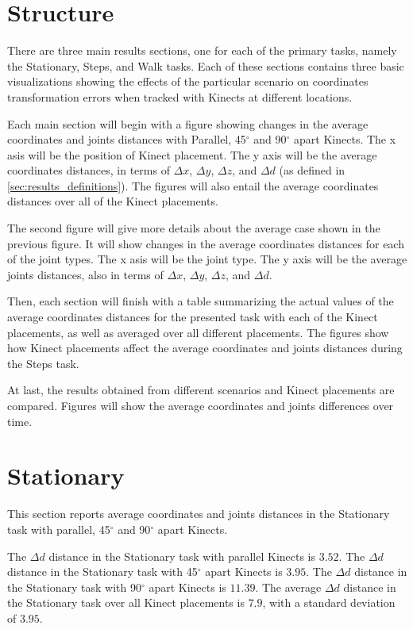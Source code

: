 \section{Structure}
\label{sec:results_structure}

There are three main results sections, one for each of the primary tasks, namely the Stationary, Steps, and Walk tasks. Each of these sections contains three basic visualizations showing the effects of the particular scenario on coordinates transformation errors when tracked with Kinects at different locations.

Each main section will begin with a figure showing changes in the average coordinates and joints distances with Parallel, 45$^{\circ}$ and 90$^{\circ}$ apart Kinects. The x asis will be the position of Kinect placement. The y axis will be the average coordinates distances, in terms of $\Delta x$, $\Delta y$, $\Delta z$, and $\Delta d$ (as defined in \ref{sec:results_definitions}). The figures will also entail the average coordinates distances over all of the Kinect placements.

The second figure will give more details about the average case shown in the previous figure. It will show changes in the average coordinates distances for each of the joint types. The x asis will be the joint type. The y axis will be the average joints distances, also in terms of $\Delta x$, $\Delta y$, $\Delta z$, and $\Delta d$.

Then, each section will finish with a table summarizing the actual values of the average coordinates distances for the presented task with each of the Kinect placements, as well as averaged over all different placements. The figures show how Kinect placements affect the average coordinates and joints distances during the Steps task.

At last, the results obtained from different scenarios and Kinect placements are compared. Figures will show the average coordinates and joints differences over time.

\section{Stationary}
\label{sec:results_stationary}

This section reports average coordinates and joints distances in the Stationary task with parallel, 45$^{\circ}$ and 90$^{\circ}$ apart Kinects.

The $\Delta d$ distance in the Stationary task with parallel Kinects is $3.52$. The $\Delta d$ distance in the Stationary task with 45$^{\circ}$ apart Kinects is $3.95$. The $\Delta d$ distance in the Stationary task with 90$^{\circ}$ apart Kinects is $11.39$. The average $\Delta d$ distance in the Stationary task over all Kinect placements is $7.9$, with a standard deviation of $3.95$.

